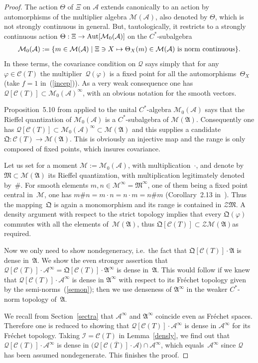 \documentclass[11pt]{article}
\def\A{{\mathcal A}}
\def\Th{\Theta}
\def\QQ{\mathfrak Q}
\def\AA{\mathfrak A}
\def\C{\mathcal{C}}
\def\Q{\mathcal Q}
\begin{document}
\begin{proof}
The action $\Th$ of $\Xi$ on $\A$ extends canonically to an action by automorphisms of the multiplier algebra
$\mathcal M(\A)$, also denoted by $\Th$, which is not strongly continuous in general.
But, tautologically, it restricts to a strongly continuous action
$\Th:\Xi\rightarrow{\rm Aut}[\mathcal M_0(\A)]$ on the $C^*$-subalgebra
\begin{gather*}%
\mathcal M_0(\A):=\{m\in\mathcal M(\A)\mid\Xi\ni X\mapsto\Th_X(m)\in\mathcal M(\A)\ {\rm is\ norm\ continuous}\}.
\end{gather*}
In these terms, the covariance condition on $\Q$ says simply that for any $\varphi\in\C(T)$ the multip\-lier~$\Q(\varphi)$ is a f\/ixed point for all the automorphisms~$\Th_X$
(take $f=1$ in~(\ref{incep})). As a very weak consequence one has
$\Q[\C(T)]\subset\mathcal M_0(\A)^\infty$, with an obvious notation for the smooth vectors.

Proposition~5.10 from \cite{Rie1} applied to the unital $C^*$-algebra $\mathcal M_0(\A)$ says that the Rief\/fel quantization of
$\mathcal M_0(\A)$ is a $C^*$-subalgebra of $\mathcal M(\AA)$. Consequently one has $\Q[\C(T)]\subset\mathcal M_0(\A)^\infty
\subset\mathcal M(\AA)$ and this supplies a candidate $\QQ:\C(T)\rightarrow\mathcal M(\AA)$.
This is obviously an injective map and the range is only composed of f\/ixed points, which insures covariance.

Let us set for a moment $\mathcal M:=\mathcal M_0(\A)$, with multiplication~$\cdot$, and denote by
$\mathfrak M\subset\mathcal M(\AA)$ its Rief\/fel quantization, with multiplication legitimately denoted by~$\#$.
For smooth elements $m,n\in\mathcal M^\infty=\mathfrak M^\infty$, one of them being a f\/ixed point central in~$\mathcal M$,
one has $m\#n=m\cdot n=n\cdot m=n\#m$ (Corollary~2.13 in~\cite{Rie1}).
Thus the mapping~$\QQ$ is again a monomorphism and its range is contained in $\mathcal Z\mathfrak M$.
A density argument with respect to the strict topology implies that every $\mathfrak Q(\varphi)$
commutes with all the elements of~$\mathcal M(\AA)$, thus $\QQ[\C(T)]\subset\mathcal Z\mathcal M(\AA)$as required.

Now we only need to show nondegeneracy, i.e.\ the fact that $\QQ[\C(T)]\cdot\AA$ is dense in~$\AA$.
We show the even stronger assertion that $\Q[\C(T)]\cdot\A^\infty=\QQ[\C(T)]\cdot\AA^\infty$ is dense in~$\AA$.
This would follow if we knew that $\Q[\C(T)]\cdot\A^\infty$ is dense in $\AA^\infty$ with respect to its Fr\'echet topology
given by the semi-norms~(\ref{semon});
then we use denseness of $\AA^\infty$ in the weaker $C^*$-norm topology of~$\AA$.

We recall from Section~\ref{sectra} that $\A^\infty$ and $\AA^\infty$ coincide even as Fr\'echet spaces.
Therefore one is reduced to showing that $\Q[\C(T)]\cdot\A^\infty$ is dense in $\A^\infty$ for its Fr\'echet topology.
Taking $\mathcal I=\C(T)$ in Lemma~\ref{densly}, we f\/ind out that $\Q[\C(T)]\cdot\A^\infty$ is dense in
$\big(\overline{\Q[\C(T)]\cdot\A}\big)\cap\A^\infty$, which equals~$\A^\infty$ since $\Q$ has been assumed
nondegenerate. This f\/inishes the proof.
\end{proof}
\end{document}
